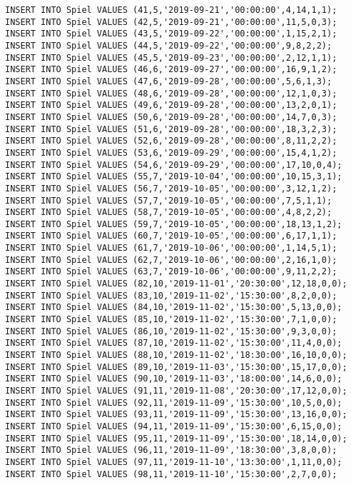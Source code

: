 \documentclass{lehramt-informatik-aufgabe}
\begin{document}
\begin{verbatim}
INSERT INTO Spiel VALUES (41,5,'2019-09-21','00:00:00',4,14,1,1);
INSERT INTO Spiel VALUES (42,5,'2019-09-21','00:00:00',11,5,0,3);
INSERT INTO Spiel VALUES (43,5,'2019-09-22','00:00:00',1,15,2,1);
INSERT INTO Spiel VALUES (44,5,'2019-09-22','00:00:00',9,8,2,2);
INSERT INTO Spiel VALUES (45,5,'2019-09-23','00:00:00',2,12,1,1);
INSERT INTO Spiel VALUES (46,6,'2019-09-27','00:00:00',16,9,1,2);
INSERT INTO Spiel VALUES (47,6,'2019-09-28','00:00:00',5,6,1,3);
INSERT INTO Spiel VALUES (48,6,'2019-09-28','00:00:00',12,1,0,3);
INSERT INTO Spiel VALUES (49,6,'2019-09-28','00:00:00',13,2,0,1);
INSERT INTO Spiel VALUES (50,6,'2019-09-28','00:00:00',14,7,0,3);
INSERT INTO Spiel VALUES (51,6,'2019-09-28','00:00:00',18,3,2,3);
INSERT INTO Spiel VALUES (52,6,'2019-09-28','00:00:00',8,11,2,2);
INSERT INTO Spiel VALUES (53,6,'2019-09-29','00:00:00',15,4,1,2);
INSERT INTO Spiel VALUES (54,6,'2019-09-29','00:00:00',17,10,0,4);
INSERT INTO Spiel VALUES (55,7,'2019-10-04','00:00:00',10,15,3,1);
INSERT INTO Spiel VALUES (56,7,'2019-10-05','00:00:00',3,12,1,2);
INSERT INTO Spiel VALUES (57,7,'2019-10-05','00:00:00',7,5,1,1);
INSERT INTO Spiel VALUES (58,7,'2019-10-05','00:00:00',4,8,2,2);
INSERT INTO Spiel VALUES (59,7,'2019-10-05','00:00:00',18,13,1,2);
INSERT INTO Spiel VALUES (60,7,'2019-10-05','00:00:00',6,17,1,1);
INSERT INTO Spiel VALUES (61,7,'2019-10-06','00:00:00',1,14,5,1);
INSERT INTO Spiel VALUES (62,7,'2019-10-06','00:00:00',2,16,1,0);
INSERT INTO Spiel VALUES (63,7,'2019-10-06','00:00:00',9,11,2,2);
INSERT INTO Spiel VALUES (82,10,'2019-11-01','20:30:00',12,18,0,0);
INSERT INTO Spiel VALUES (83,10,'2019-11-02','15:30:00',8,2,0,0);
INSERT INTO Spiel VALUES (84,10,'2019-11-02','15:30:00',5,13,0,0);
INSERT INTO Spiel VALUES (85,10,'2019-11-02','15:30:00',7,1,0,0);
INSERT INTO Spiel VALUES (86,10,'2019-11-02','15:30:00',9,3,0,0);
INSERT INTO Spiel VALUES (87,10,'2019-11-02','15:30:00',11,4,0,0);
INSERT INTO Spiel VALUES (88,10,'2019-11-02','18:30:00',16,10,0,0);
INSERT INTO Spiel VALUES (89,10,'2019-11-03','15:30:00',15,17,0,0);
INSERT INTO Spiel VALUES (90,10,'2019-11-03','18:00:00',14,6,0,0);
INSERT INTO Spiel VALUES (91,11,'2019-11-08','20:30:00',17,12,0,0);
INSERT INTO Spiel VALUES (92,11,'2019-11-09','15:30:00',10,5,0,0);
INSERT INTO Spiel VALUES (93,11,'2019-11-09','15:30:00',13,16,0,0);
INSERT INTO Spiel VALUES (94,11,'2019-11-09','15:30:00',6,15,0,0);
INSERT INTO Spiel VALUES (95,11,'2019-11-09','15:30:00',18,14,0,0);
INSERT INTO Spiel VALUES (96,11,'2019-11-09','18:30:00',3,8,0,0);
INSERT INTO Spiel VALUES (97,11,'2019-11-10','13:30:00',1,11,0,0);
INSERT INTO Spiel VALUES (98,11,'2019-11-10','15:30:00',2,7,0,0);

\end{verbatim}
\end{document}
